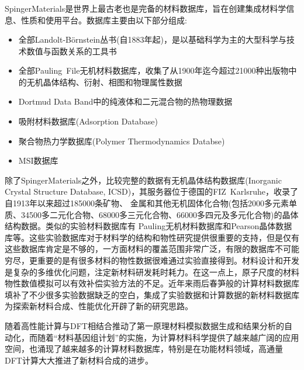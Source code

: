 {
	\frametitle{}
\textrm{SpingerMaterials}\cite{SpringerM_URL}是世界上最古老也是完备的材料数据库，旨在创建集成材料学信息、性质和使用平台。数据库主要由以下部分组成:
\begin{itemize}
	\item 全部\textrm{Landolt-B{\"o}rnstein}丛书(自1883年起)，是以基础科学为主的大型科学与技术数值与函数关系的工具书
	\item 全部\textrm{Pauling~File}无机材料数据库，收集了从1900年迄今超过21000种出版物中的无机晶体结构、衍射、相图和物理属性数据
	\item \textrm{Dortmud Data Band}中的纯液体和二元混合物的热物理数据
	\item 吸附材料数据库(\textrm{Adsorption Database})
	\item 聚合物热力学数据库(\textrm{Polymer Thermodynamics Databse})
	\item \textrm{MSI}数据库
\end{itemize}

除了\textrm{SpingerMaterials}之外，比较完整的数据有无机晶体结构数据库\textrm{(Inorganic Crystal Structure Database, ICSD)}\cite{ICSD_URL}，其服务器位于德国的\textrm{FIZ~Karlsruhe}，收录了自1913年以来超过185000条矿物、 金属和其他无机固体化合物(包括2000多元素单质、34500多二元化合物、68000多三元化合物、66000多四元及多元化合物)的晶体结构数据。类似的实验材料数据库有%
\textrm{Pauling}无机材料数据库\cite{Pauling_URL}和\textrm{Pearson}晶体数据库\cite{Pearson_URL}等。这些实验数据库对于材料学的结构和物性研究提供很重要的支持，但是仅有这些数据库肯定是不够的，一方面材料的覆盖范围非常广泛，有限的数据库不可能穷尽，更重要的是有很多材料的物性数据很难通过实验直接得到。材料设计和开发是复杂的多维优化问题，注定新材料研发耗时耗力。在这一点上，原子尺度的材料物性数值模拟可以有效补偿实验方法的不足。近年来雨后春笋般的计算材料数据库填补了不少很多实验数据缺乏的空白\cite{CMS58-227_2012}，集成了实验数据和计算数据的新材料数据库为探索新材料合成、性能优化开辟了新的研究思路。

随着高性能计算与\textrm{DFT}相结合推动了第一原理材料模拟数据生成和结果分析的自动化，而随着“材料基因组计划”的实施，为计算材料科学提供了越来越广阔的应用空间，也涌现了越来越多的计算材料数据库，特别是在功能材料领域，高通量\textrm{DFT}计算大大推进了新材料合成的进步。\cite{JCED59-3232_2014, IC53-11849_2014,JPCL4-3607_2013,PCCP16-22073_2014}
}

